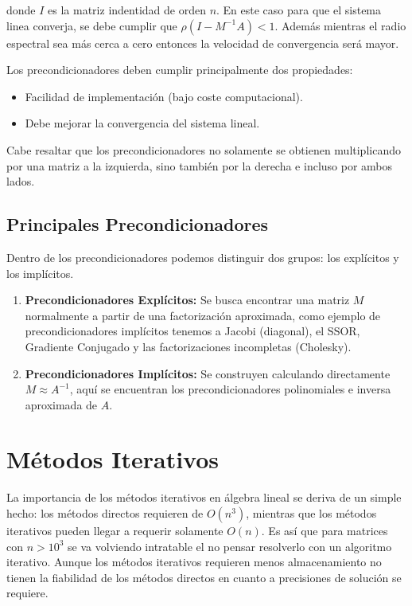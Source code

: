 \documentclass[11pt,letterpaper]{article}
\begin{document}
donde $I$ es la matriz indentidad de orden $n$. En este caso para que el sistema linea converja, se debe cumplir que $\rho(I - M^{-1}A) < 1$. Además mientras el radio espectral sea más cerca a cero entonces la velocidad de convergencia será mayor. 

\vspace{0.2cm}
Los precondicionadores deben cumplir principalmente dos propiedades:
\begin{itemize}
\item Facilidad de implementación (bajo coste computacional).
\item Debe mejorar la convergencia del sistema lineal.
\end{itemize}

Cabe resaltar que los precondicionadores no solamente se obtienen multiplicando por una matriz a la izquierda, sino también por la derecha e incluso por ambos lados.

\subsection{Principales Precondicionadores}

Dentro de los precondicionadores podemos distinguir dos grupos: los explícitos y los implícitos.

\begin{enumerate}
\item \textbf{Precondicionadores Explícitos:} Se busca encontrar una matriz $M$ normalmente a partir de una factorización aproximada, como ejemplo de precondicionadores implícitos tenemos a Jacobi (diagonal), el SSOR, Gradiente Conjugado y las factorizaciones incompletas (Cholesky).

\item \textbf{Precondicionadores Implícitos:} Se construyen calculando directamente $M \approx A^{-1}$, aquí se encuentran los precondicionadores polinomiales e inversa aproximada de $A$.
\end{enumerate}
 

\section{Métodos Iterativos}


La importancia de los métodos iterativos en álgebra lineal se deriva de un simple hecho: los métodos directos requieren de $O(n^{3})$, mientras que los métodos iterativos pueden llegar a requerir solamente $O(n)$. Es así que para matrices con $n > 10^{3}$ se va volviendo intratable el no pensar resolverlo con un algoritmo iterativo. 
Aunque los métodos iterativos requieren menos almacenamiento no tienen la fiabilidad de los métodos directos en cuanto a precisiones de solución se requiere. 
\end{document}
